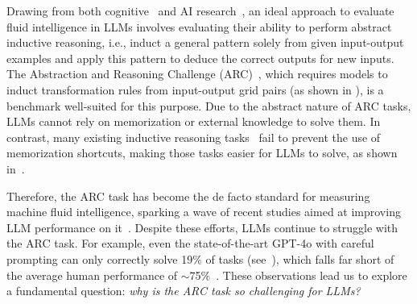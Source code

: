 Drawing from both cognitive~\cite{jensen1998factor} and AI research~\cite{chollet2019measure, barak2024investigating}, an ideal approach to evaluate fluid intelligence in LLMs involves evaluating their ability to perform abstract inductive reasoning, i.e., induct a general pattern solely from given input-output examples and apply this pattern to deduce the correct outputs for new inputs. %
The Abstraction and Reasoning Challenge (ARC)~\cite{chollet2019measure}, which requires models to induct transformation rules from input-output grid pairs (as shown in ), is a benchmark well-suited for this purpose. Due to the abstract nature of ARC tasks, LLMs cannot rely on memorization or external knowledge to solve them. In contrast, many existing inductive reasoning tasks~\cite{honovich2023instruction, yang2024language, qiuphenomenal} fail to prevent the use of memorization shortcuts, making those tasks easier for LLMs to solve, as shown in~.

Therefore, the ARC task has become the de facto standard for measuring machine fluid intelligence, sparking a wave of recent studies aimed at improving LLM performance on it~\cite{acquaviva2022communicating, xullms, wang2023hypothesis, wang2024speak}. Despite these efforts, LLMs continue to struggle with the ARC task. For example, even the state-of-the-art GPT-4o with careful prompting can only correctly solve 19\% of tasks (see~), which falls far short of the average human performance of $\sim$75\%~\cite{legris2024h}. These observations lead us to explore a fundamental question: {\em why is the ARC task so challenging for LLMs?}



